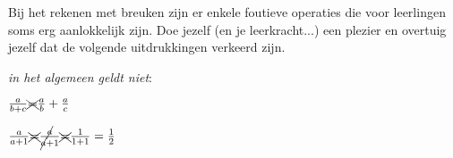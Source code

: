 \documentclass{ximera}
\begin{document}
Bij het rekenen met breuken zijn er enkele foutieve operaties die voor leerlingen soms erg aanlokkelijk zijn. 
Doe jezelf (en je leerkracht...) een plezier en overtuig jezelf dat de volgende uitdrukkingen verkeerd zijn. 



    








\begin{remark}
\textit{in het algemeen geldt niet}:

\renewcommand\CancelColor{\color{red}}


  $ \frac{a}{b+c} \xcancel{=} \frac{a}{b} + \frac{a}{c} $ 


$ \frac{a}{a+1} \xcancel{=} \frac{\cancel{a}}{\cancel{a}+1}  \xcancel{=} \frac{1}{1+1} = \frac{1}{2} $

\end{remark}
\end{document}
